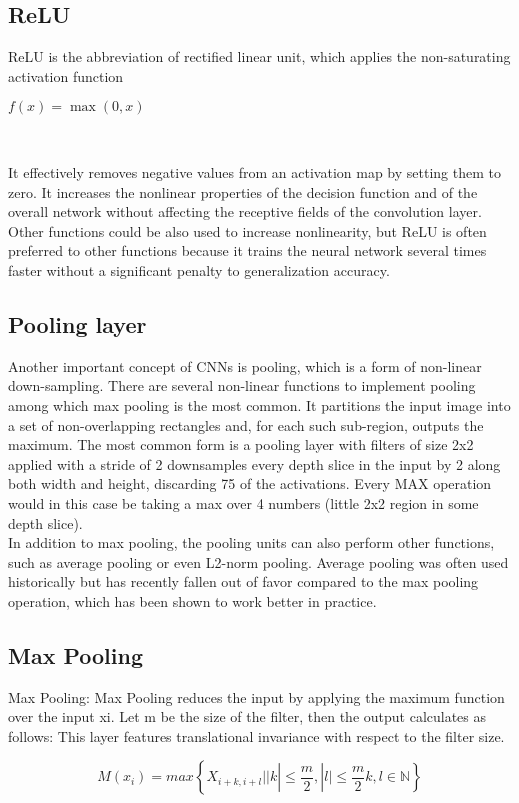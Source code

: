 \subsection{ReLU}
ReLU is the abbreviation of rectified linear unit, which applies the non-saturating activation function\\
\begin{center}
    \begin{large}
        $f(x)=\max(0,x)$
    \end{large} \\
\end{center}
It effectively removes negative values from an activation map by setting them to zero. It increases the nonlinear properties of the decision function and of the overall network without affecting the receptive fields of the convolution layer.\\
Other functions could be also used to increase nonlinearity, but ReLU is often preferred to other functions because it trains the neural network several times faster without a significant penalty to generalization accuracy.

\subsection{Pooling layer}
Another important concept of CNNs is pooling, which is a form of non-linear down-sampling. There are several non-linear functions to implement pooling among which max pooling is the most common. It partitions the input image into a set of non-overlapping rectangles and, for each such sub-region, outputs the maximum. The most common form is a pooling layer with filters of size 2x2 applied with a stride of 2 downsamples every depth slice in the input by 2 along both width and height, discarding 75 %
of the activations. Every MAX operation would in this case be taking a max over 4 numbers (little 2x2 region in some depth slice). \\
In addition to max pooling, the pooling units can also perform other functions, such as average pooling or even L2-norm pooling. Average pooling was often used historically but has recently fallen out of favor compared to the max pooling operation, which has been shown to work better in practice.\\

\subsection{Max Pooling}
Max Pooling: Max Pooling reduces the input by applying the maximum function over the input xi. Let m be the size of the filter, then the output calculates as follows:
This layer features translational invariance with respect to the filter size.
\begin{center}
    \begin{large}
        $$M(x_i)=max\left \{X_{i+k,i+l}||k|\leq \frac{m}{2},|l|\leq \frac{m}{2}k,l\in \mathbb{N}\right \}$$
    \end{large} \\
\end{center}

